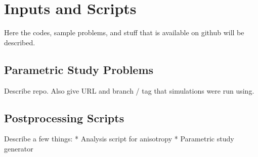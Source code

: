\section{Inputs and Scripts}
\label{sec:github_codes}

Here the codes, sample problems, and stuff that is available on github will be
described.

\subsection{Parametric Study Problems}

Describe repo. Also give URL and branch / tag that simulations were run using.

\subsection{Postprocessing Scripts}
\label{sec:postprocess}

Describe a few things:
* Analysis script for anisotropy
* Parametric study generator

